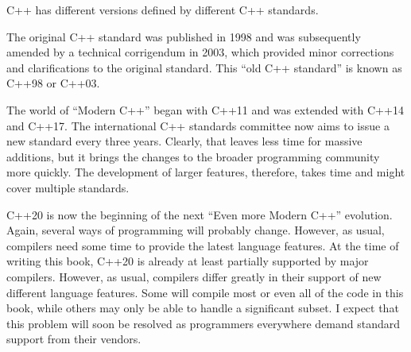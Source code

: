 C++ has different versions defined by different C++ standards.

The original C++ standard was published in 1998 and was subsequently amended by a technical corrigendum in 2003, which provided minor corrections and clarifications to the original standard. This “old C++ standard” is known as C++98 or C++03.

The world of “Modern C++” began with C++11 and was extended with C++14 and C++17. The international C++ standards committee now aims to issue a new standard every three years. Clearly, that leaves less time for massive additions, but it brings the changes to the broader programming community more quickly. The development of larger features, therefore, takes time and might cover multiple standards.

C++20 is now the beginning of the next “Even more Modern C++” evolution. Again, several ways of programming will probably change. However, as usual, compilers need some time to provide the latest language features. At the time of writing this book, C++20 is already at least partially supported by major compilers. However, as usual, compilers differ greatly in their support of new different language features. Some will compile most or even all of the code in this book, while others may only be able to handle a significant subset. I expect that this problem will soon be resolved as programmers everywhere demand standard support from their vendors.